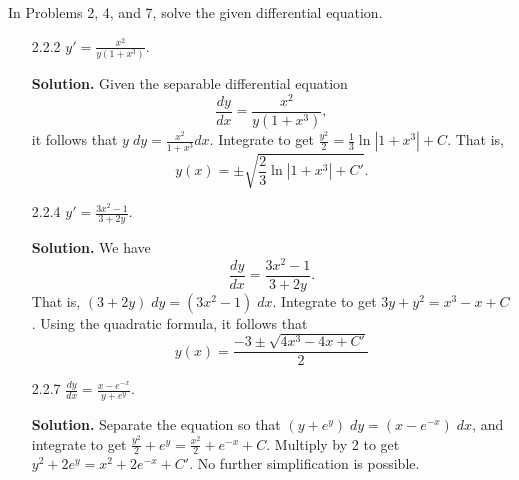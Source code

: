 In Problems 2, 4, and 7, solve the given differential equation.
\begin{enumerate}
   \item[2.2.2]   $y' = \frac{x^2}{y(1 + x^3)}$.

      \textbf{Solution.} Given the separable differential equation
      $$\frac{dy}{dx} = \frac{x^2}{y(1+x^3)},$$
      it follows that
      $y\;dy = \frac{x^2}{1+x^3} dx$. Integrate to get
      $\frac{y^2}{2} = \frac{1}{3}\ln|1 + x^3| + C$. That is,
      $$y(x) = \pm\sqrt{\frac{2}{3}\ln|1 + x^3| + C'}.$$
   \item[2.2.4]   $y' = \frac{3x^2 - 1}{3 + 2y}$.

      \textbf{Solution.} We have
      $$\frac{dy}{dx} = \frac{3x^2 - 1}{3 + 2y}.$$
      That is, $(3 + 2y)\;dy = (3x^2 - 1)\;dx$. Integrate to get
      $3y + y^2 = x^3 - x + C$. Using the quadratic formula, it follows that
      $$y(x) = \frac{-3 \pm \sqrt{4x^3 - 4x + C'}}{2}$$
   \item[2.2.7]   $\frac{dy}{dx} = \frac{x - e^{-x}}{y + e^y}$.

      \textbf{Solution.} Separate the equation so that
      $(y + e^y)\;dy = (x - e^{-x})\;dx$, and integrate to get
      $\frac{y^2}{2} + e^y = \frac{x^2}{2} + e^{-x} + C$. Multiply by 2 to get
      $y^2 + 2e^y = x^2 + 2e^{-x} + C'$. No further simplification is possible.
\end{enumerate}

